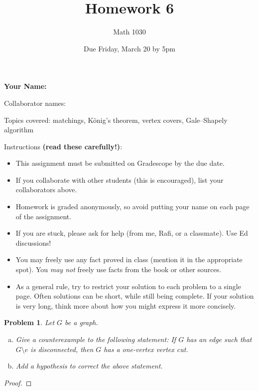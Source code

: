 \documentclass[11pt]{article}
\author{Math 1030}
\date{Due Friday, March 20 by 5pm}
\title{Homework 6}
\newtheorem{problem}{Problem}
\begin{document}
\maketitle

{\bf\Large Your Name:} 

Collaborator names: 

\vspace{.3in}
Topics covered: matchings, K\"onig's theorem, vertex covers, Gale--Shapely algorithm 

Instructions {\bf (read these carefully!)}: 
\begin{itemize}
\item This assignment must be submitted on Gradescope by the due date. 
\item If you collaborate with other students (this is encouraged),  list your collaborators above. 
\item Homework is graded anonymously, so avoid putting your name on each page of the assignment.
\item If you are stuck, please ask for help (from me, Rafi, or a classmate). Use Ed discussions!  
\item You may freely use any fact proved in class (mention it in the appropriate spot). You \emph{may not} freely use facts from the book or other sources.
\item As a general rule, try to restrict your solution to each problem to a single page. Often solutions can be short, while still being complete. If your solution is very long, think more about how you might express it more concisely.
\end{itemize}
\pagebreak 


\begin{problem}
Let $G$ be a graph. 
\begin{enumerate}[(a)]
\item Give a counterexample to the following statement: If $G$ has an edge such that $G\setminus e$ is disconnected, then $G$ has a one-vertex vertex cut. 
\item Add a hypothesis to correct the above statement. 
\end{enumerate} 
\end{problem}

\begin{proof}

\end{proof}

\pagebreak
\end{document}
